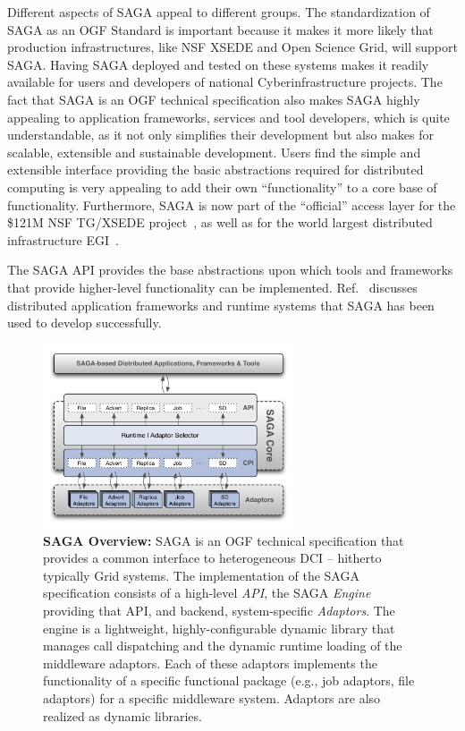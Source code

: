 \documentclass[]{svjour3}
\begin{document}
Different aspects of SAGA appeal to different groups. The standardization
of SAGA as an OGF Standard is important because it makes it more likely that
production infrastructures, like NSF XSEDE and Open Science Grid, will support
SAGA. Having SAGA deployed and tested on these systems makes it
readily available for users and developers of national Cyberinfrastructure
projects. The fact that SAGA is an OGF technical specification also makes
SAGA highly appealing to application frameworks, services and tool developers,
which is quite understandable, as it not only simplifies their development but also
makes for scalable, extensible and sustainable development. Users find
the simple and extensible interface providing the basic abstractions
required for distributed computing is very appealing to add their own
“functionality” to a core base of functionality. Furthermore, SAGA is
now part of the “official” access layer for the \$121M NSF TG/XSEDE
project~\cite{XSEDE}, as well as for the world largest
distributed infrastructure EGI~\cite{EGI}.

The SAGA API provides the base abstractions upon which tools and
frameworks that provide higher-level functionality can be
implemented. Ref.~\cite{saga_url} discusses distributed application
frameworks and runtime systems that SAGA has been used to develop
successfully. 


\begin{figure}[t]
\centering \includegraphics[width=0.66\textwidth]{figures/saga-architecture-1.png}
\caption{\textbf{SAGA Overview: } SAGA is an OGF technical
 specification that provides a common interface to heterogeneous DCI
 -- hitherto typically Grid systems. The implementation of the
 SAGA\cite{saga_url} specification consists of a high-level {\it
  API}, the SAGA {\it Engine} providing that API, and backend,
 system-specific {\it Adaptors}. The engine is a lightweight,
 highly-configurable dynamic library that manages call dispatching
 and the dynamic runtime loading of the middleware adaptors. Each of
 these adaptors implements the functionality of a specific functional
 package (e.g., job adaptors, file adaptors) for a specific
 middleware system. Adaptors are also realized as dynamic libraries.}
 \label{fig:saga-overview}
\end{figure}
\end{document}
